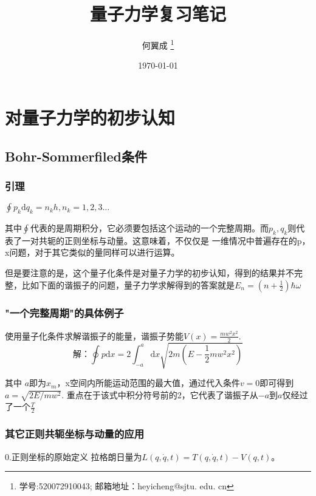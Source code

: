 \documentclass[UTF8,a4paper,10pt]{ctexart}
\title{\textbf{量子力学复习笔记}}
\author{ 何翼成 \thanks{学号:520072910043; \newline
    邮箱地址：heyicheng@sjtu. edu. cn} }
\date{\today}
\begin{document}
\maketitle

\tableofcontents
\section{对量子力学的初步认知}
\subsection{Bohr-Sommerfiled条件}
\subsubsection{引理}
$\oint p_{k}\mathrm{d}q_{k}=n_{k}h,n_{k}=1,2,3\dots$\newline

其中$\oint$代表的是周期积分，它必须要包括这个运动的一个完整周期。而$p_{k},q_{k}$则代表了一对共轭的正则坐标与动量。这意味着，不仅仅是
一维情况中普遍存在的p，x问题，对于其它类似的量同样可以进行运算。\newline

但是要注意的是，这个量子化条件是对量子力学的初步认知，得到的结果并不完整，比如下面的谐振子的问题，量子力学求解得到的答案就是$E_{n}=(n+\frac{1}{2})\hbar\omega$
\subsubsection{"一个完整周期"的具体例子}

使用量子化条件求解谐振子的能量，谐振子势能$V(x)=\frac{mw^2x^2}{2}$.
\begin{equation}
    解：
    \oint p\mathrm{d}x=2\int_{-a}^{a}\mathrm{d}x\sqrt{2m(E-\frac{1}{2}mw^2x^2)}
\end{equation}
\quad \newline

其中 $a$即为$x_{m}$，x空间内所能运动范围的最大值，通过代入条件$v=0$即可得到$a=\sqrt{2E/mw^2}$.
重点在于该式中积分符号前的2，它代表了谐振子从$-a$到$a$仅经过了一个$\frac{T}{2}$
\subsubsection{其它正则共轭坐标与动量的应用}
0.正则坐标的原始定义
拉格朗日量为$L(q,\dot q,t)=T(q,\dot q,t)-V(q,t)$。\quad \newline
\end{document}
